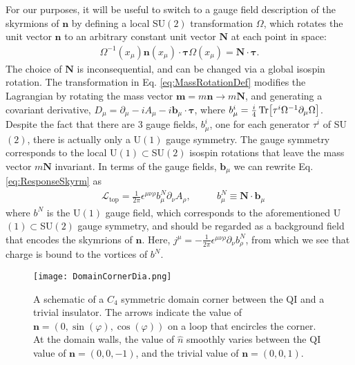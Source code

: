 \documentclass[%
 reprint,
 amsmath,amssymb,
 aps,
]{revtex4-1}
\begin{document}
For our purposes, it will be useful to switch to a gauge field description of the skyrmions of $\bm{n}$\cite{han2017skyrmions} by defining a local SU$(2)$ transformation $\Omega$, which rotates the unit vector $\bm{n}$ to an arbitrary constant unit vector $\bm{N}$ at each point in space: 
\begin{equation}\begin{split}
  \Omega^{-1}(x_\mu) \bm{n}(x_\mu) \cdot \bm{\tau} \Omega(x_\mu)= \bm{N}\cdot \bm{\tau}.
 \label{eq:MassRotationDef}\end{split}\end{equation}
The choice of $\bm{N}$ is inconsequential, and can be changed via a global isospin rotation. The transformation in Eq. \ref{eq:MassRotationDef} modifies the Lagrangian by rotating the mass vector $\bm{m} = m\bm{n}\rightarrow m\bm{N}$, and generating a covariant derivative, $D_\mu = \partial_\mu -i A_\mu -i \bm{b}_\mu \cdot \bm{\tau}$, where $b^i_\mu = \frac{i}{4}\Tr[\tau^i \Omega^{-1}\partial_\mu \Omega]$. Despite the fact that there are $3$ gauge fields, $b^i_\mu$, one for each generator $\tau^i$ of SU$(2)$, there is actually only a U$(1)$ gauge symmetry. The gauge symmetry corresponds to the local U$(1) \subset $SU$(2)$ isospin rotations that leave the mass vector $m \bm{N}$ invariant. In terms of the gauge fields, $\bm{b}_\mu$ we can rewrite Eq. \ref{eq:ResponseSkyrm} as
\begin{equation}\begin{split}
&\mathcal{L}_{\text{top}} = \frac{1}{2\pi}\epsilon^{\mu\nu\rho} b^N_{\mu} \partial_{\nu} A_{\rho},\phantom{==} b^N_\mu \equiv \bm{N}\cdot \bm{b}_\mu
\label{eq:ResponseGauge}\end{split}\end{equation}
where $b^N$ is the U$(1)$ gauge field, which corresponds to the aforementioned U$(1) \subset$SU$(2)$ gauge symmetry, and should be regarded as a background field that encodes the skymrions of $\bm{n}$. Here, $j^\mu =-\frac{1}{2\pi} \epsilon^{\mu\nu\rho} \partial_\nu b_\rho^N$, from which we see that charge is bound to the vortices of $b^N$. 


\begin{figure}
\centering
\texttt{[image: DomainCornerDia.png]}
\caption{A schematic of a $C_4$ symmetric domain corner between the QI and a trivial insulator. The arrows indicate the value of $\bm{n} = (0,\sin(\varphi),\cos(\varphi))$ on a loop that encircles the corner. At the domain walls, the value of $\hat{n}$ smoothly varies between the QI value of $\bm{n} = (0,0,-1)$, and the trivial value of $\bm{n} = (0,0,1)$.}\label{fig:DomainCornerDia}
\end{figure}
\end{document}
